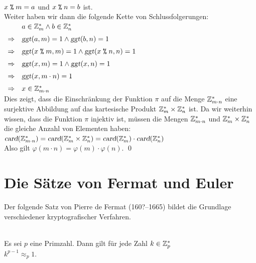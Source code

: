 \\[0.2cm]
\hspace*{1.3cm}
$x \;\texttt{\%}\; m = a$ \quad und \quad $x \;\texttt{\%}\; n = b$ ist.
\\[0.2cm]
Weiter haben wir dann die folgende Kette von Schlussfolgerungen:
\\[0.2cm]
\hspace*{1.3cm}
$
\begin{array}[t]{cl}
            & a \in \mathbb{Z}_{m}^* \wedge b \in \mathbb{Z}_{n}^*                                        \\[0.2cm]
\Rightarrow & \textsl{ggt}(a, m) = 1 \wedge \textsl{ggt}(b, n) = 1                      \\[0.2cm]
\Rightarrow & \textsl{ggt}(x \;\texttt{\%}\; m, m) = 1 \wedge \textsl{ggt}(x \;\texttt{\%}\; n, n) = 1  \\[0.2cm]
\Rightarrow & \textsl{ggt}(x, m) = 1 \wedge \textsl{ggt}(x, n) = 1                      \\[0.2cm]
\Rightarrow & \textsl{ggt}(x, m \cdot n) = 1                                            \\[0.2cm]
\Rightarrow & x \in \mathbb{Z}_{m \cdot n}^*                                                     
\end{array}
$
\\[0.2cm]
Dies zeigt, dass die Einschr\"{a}nkung der Funktion $\pi$ auf die Menge $\mathbb{Z}_{m \cdot n}^*$ eine
surjektive Abbildung auf das kartesische Produkt $\mathbb{Z}_{m}^* \times \mathbb{Z}_{n}^*$ ist.  Da wir weiterhin
wissen, dass die Funktion $\pi$ injektiv ist, m\"{u}ssen die Mengen $\mathbb{Z}_{m \cdot n}^*$ und 
 $\mathbb{Z}_{m}^* \times \mathbb{Z}_{n}^*$ die gleiche Anzahl von Elementen haben:
\\[0.2cm]
\hspace*{1.3cm}
$\textsl{card}(\mathbb{Z}_{m \cdot n}^*) 
  = \textsl{card}(\mathbb{Z}_{m}^* \times \mathbb{Z}_{n}^*) 
  = \textsl{card}(\mathbb{Z}_{m}^*) \cdot \textsl{card}(\mathbb{Z}_{n}^*) 
$
\\[0.2cm]
Also gilt $\varphi(m \cdot n) = \varphi(m) \cdot \varphi(n)$. 
\qed


\section{Die S\"{a}tze von Fermat und Euler}
Der folgende Satz von Pierre de Fermat (160?--1665) bildet die Grundlage verschiedener kryptografischer
Verfahren. 

\begin{Satz} \hspace*{\fill} \\ 
Es sei $p$ eine Primzahl.  Dann gilt f\"{u}r jede Zahl $k \in \mathbb{Z}_{p}^*$
\\[0.2cm]
\hspace*{1.3cm}
$k^{p-1} \approx_p 1$.  
\end{Satz}

